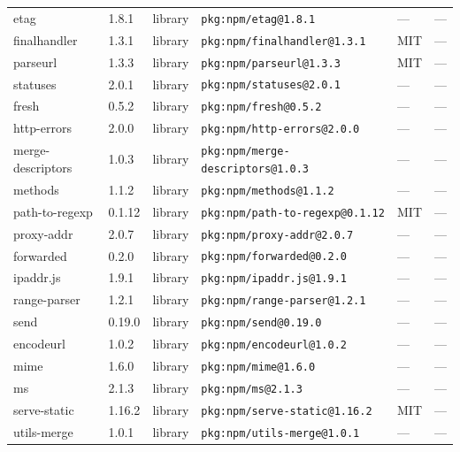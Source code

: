 \documentclass[11pt,a4paper]{article}
\begin{document}
\begin{longtable}{|p{4cm}|p{2cm}|p{1.6cm}|p{5cm}|p{1.5cm}|p{3.5cm}|}
\raggedright etag & 1.8.1 & library & \small\texttt{pkg:npm/etag@1.8.1} & — & \small — \\
\raggedright finalhandler & 1.3.1 & library & \small\texttt{pkg:npm/finalhandler@1.3.1} & MIT & \small — \\
\raggedright parseurl & 1.3.3 & library & \small\texttt{pkg:npm/parseurl@1.3.3} & MIT & \small — \\
\raggedright statuses & 2.0.1 & library & \small\texttt{pkg:npm/statuses@2.0.1} & — & \small — \\
\raggedright fresh & 0.5.2 & library & \small\texttt{pkg:npm/fresh@0.5.2} & — & \small — \\
\raggedright http-errors & 2.0.0 & library & \small\texttt{pkg:npm/http-errors@2.0.0} & — & \small — \\
\raggedright merge-descriptors & 1.0.3 & library & \small\texttt{pkg:npm/merge-descriptors@1.0.3} & — & \small — \\
\raggedright methods & 1.1.2 & library & \small\texttt{pkg:npm/methods@1.1.2} & — & \small — \\
\raggedright path-to-regexp & 0.1.12 & library & \small\texttt{pkg:npm/path-to-regexp@0.1.12} & MIT & \small — \\
\raggedright proxy-addr & 2.0.7 & library & \small\texttt{pkg:npm/proxy-addr@2.0.7} & — & \small — \\
\raggedright forwarded & 0.2.0 & library & \small\texttt{pkg:npm/forwarded@0.2.0} & — & \small — \\
\raggedright ipaddr.js & 1.9.1 & library & \small\texttt{pkg:npm/ipaddr.js@1.9.1} & — & \small — \\
\raggedright range-parser & 1.2.1 & library & \small\texttt{pkg:npm/range-parser@1.2.1} & — & \small — \\
\raggedright send & 0.19.0 & library & \small\texttt{pkg:npm/send@0.19.0} & — & \small — \\
\raggedright encodeurl & 1.0.2 & library & \small\texttt{pkg:npm/encodeurl@1.0.2} & — & \small — \\
\raggedright mime & 1.6.0 & library & \small\texttt{pkg:npm/mime@1.6.0} & — & \small — \\
\raggedright ms & 2.1.3 & library & \small\texttt{pkg:npm/ms@2.1.3} & — & \small — \\
\raggedright serve-static & 1.16.2 & library & \small\texttt{pkg:npm/serve-static@1.16.2} & MIT & \small — \\
\raggedright utils-merge & 1.0.1 & library & \small\texttt{pkg:npm/utils-merge@1.0.1} & — & \small — \\

\end{longtable}
\end{document}

